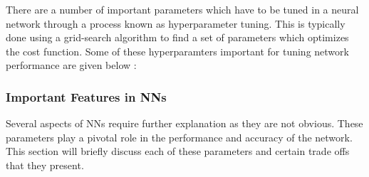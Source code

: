 There are a number of important parameters which have to be tuned in a neural
network through a process known as hyperparameter tuning. This is typically done
using a grid-search algorithm to find a set of parameters which optimizes the
cost function. \cite{LiDL2019} Some of these hyperparamters important for tuning
network performance are given below :

\subsubsection{Important Features in \ac{NN}s}
Several aspects of \ac{NN}s require further explanation as they are not obvious.
These parameters play a pivotal role in the performance and accuracy of the
network. This section will briefly discuss each of these parameters and certain
trade offs that they present.

